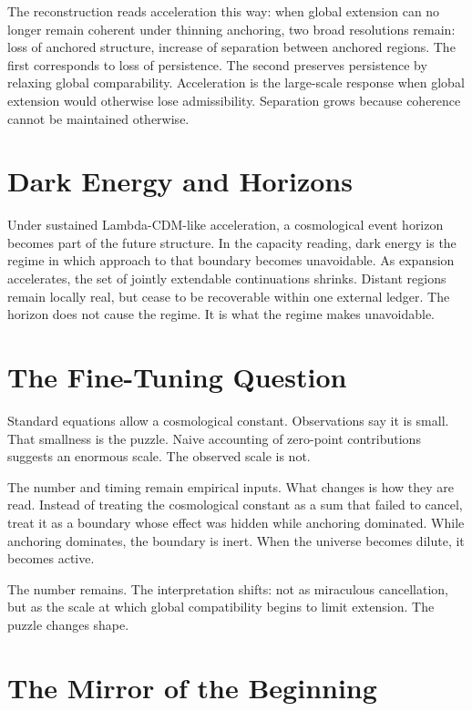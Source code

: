 \documentclass[11pt,twoside,openright]{book}
\begin{document}
The reconstruction reads acceleration this way: when global extension can no longer remain coherent under thinning anchoring, two broad resolutions remain: loss of anchored structure, increase of separation between anchored regions. The first corresponds to loss of persistence. The second preserves persistence by relaxing global comparability. Acceleration is the large-scale response when global extension would otherwise lose admissibility. Separation grows because coherence cannot be maintained otherwise.

\section*{Dark Energy and Horizons}

Under sustained Lambda-CDM-like acceleration, a cosmological event horizon becomes part of the future structure. In the capacity reading, dark energy is the regime in which approach to that boundary becomes unavoidable. As expansion accelerates, the set of jointly extendable continuations shrinks. Distant regions remain locally real, but cease to be recoverable within one external ledger. The horizon does not cause the regime. It is what the regime makes unavoidable.

\section*{The Fine-Tuning Question}

Standard equations allow a cosmological constant. Observations say it is small. That smallness is the puzzle. Naive accounting of zero-point contributions suggests an enormous scale. The observed scale is not.

The number and timing remain empirical inputs. What changes is how they are read. Instead of treating the cosmological constant as a sum that failed to cancel, treat it as a boundary whose effect was hidden while anchoring dominated. While anchoring dominates, the boundary is inert. When the universe becomes dilute, it becomes active.

The number remains. The interpretation shifts: not as miraculous cancellation, but as the scale at which global compatibility begins to limit extension. The puzzle changes shape.

\section*{The Mirror of the Beginning}
\end{document}
